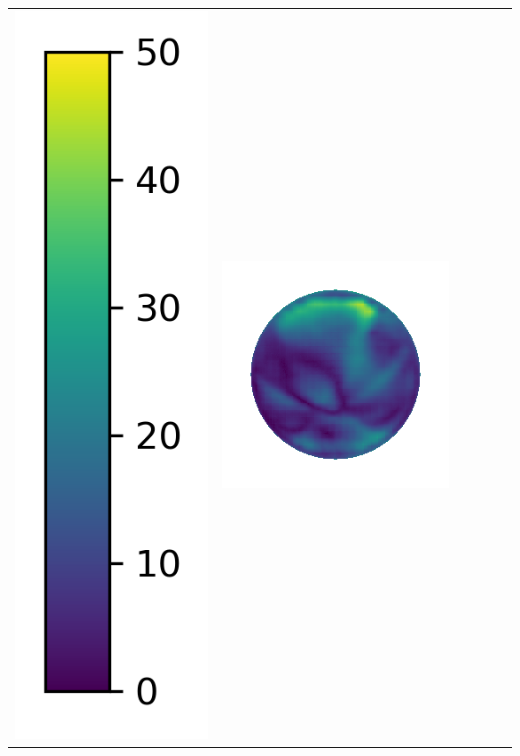 \begin{center}
\begin{tabularx}{\linewidth}{@{}Y@{}Y@{}Y@{}Y@{}Y@{}Y@{}}
\includegraphics[width=0.2\linewidth]{semisynthetic/colorbar_error_vertical.png} &
\includegraphics[width=\linewidth]{semisynthetic/20150514_13_ours_err.png} &

\end{tabularx}
\end{center}
